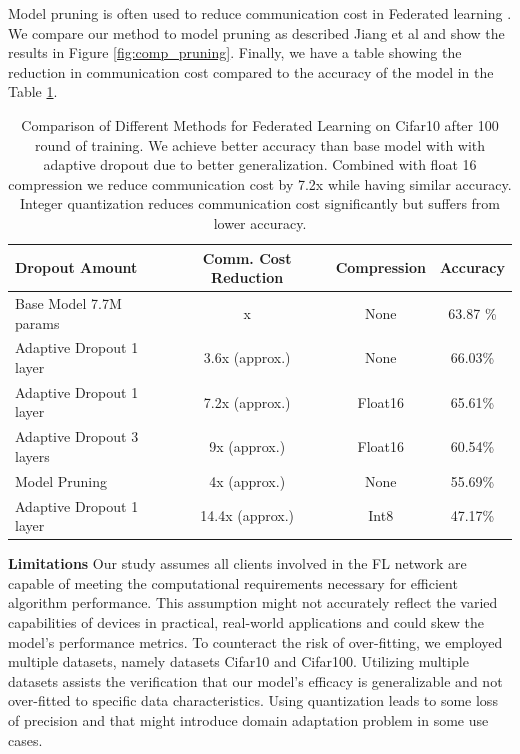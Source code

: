 \documentclass{article}
\begin{document}
Model pruning is often used to reduce communication cost in Federated learning \cite{vahidian2021personalized,jiang2022model,zhang2022fedduap}. We compare our method to model pruning as described Jiang et al \cite{jiang2022model} and show the results in Figure \ref{fig:comp_pruning}. Finally, we have a table showing the reduction in communication cost compared to the accuracy of the model in the Table \ref{tab:tab}.

\begin{table}[ht]
\centering
\caption{Comparison of Different Methods for Federated Learning on Cifar10 after 100 round of training. We achieve better accuracy than base model with with adaptive dropout due to better generalization. Combined with float 16 compression we reduce communication cost by 7.2x while having similar accuracy. Integer quantization reduces communication cost significantly but suffers from lower accuracy.}
\label{tab:method_comparison}
\begin{tabular}{|l|c|c|c|}
\hline
\textbf{Dropout Amount} & \textbf{Comm. Cost Reduction} & \textbf{Compression} & \textbf{Accuracy} \\ \hline
Base Model 7.7M params & x & None & 63.87 \% \\ \hline
Adaptive Dropout 1 layer & 3.6x (approx.) & None & 66.03\% \\ \hline
Adaptive Dropout 1 layer & 7.2x (approx.)&Float16 & 65.61\% \\ \hline
Adaptive Dropout 3 layers & 9x (approx.) & Float16 & 60.54\%\\\hline
Model Pruning & 4x (approx.) & None & 55.69\%  \\ \hline
Adaptive Dropout 1 layer & 14.4x (approx.) & Int8 & 47.17\% \\ \hline
\end{tabular}
\label{tab:tab}
\end{table}


\textbf{Limitations}
Our study assumes all clients involved in the FL network are capable of meeting the computational requirements necessary for efficient algorithm performance. This assumption might not accurately reflect the varied capabilities of devices in practical, real-world applications and could skew the model's performance metrics. To counteract the risk of over-fitting, we employed multiple datasets, namely datasets Cifar10 and Cifar100. Utilizing multiple datasets assists the verification that our model's efficacy is generalizable and not over-fitted to specific data characteristics. Using quantization leads to some loss of precision and that might introduce domain adaptation problem in some use cases. 
\end{document}
